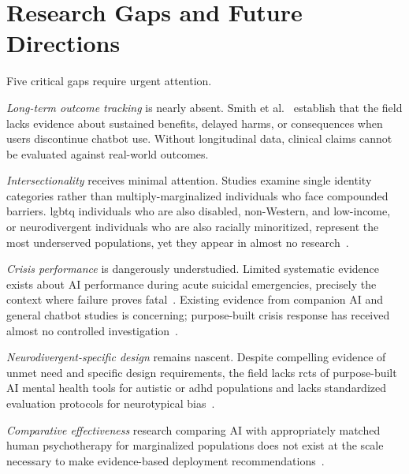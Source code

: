 \section{Research Gaps and Future Directions}

Five critical gaps require urgent attention.

\textit{Long-term outcome tracking} is nearly absent. Smith et al.~\cite{smith_2023} establish that the field lacks evidence about sustained benefits, delayed harms, or consequences when users discontinue chatbot use. Without longitudinal data, clinical claims cannot be evaluated against real-world outcomes.

\textit{Intersectionality} receives minimal attention. Studies examine single identity categories rather than multiply-marginalized individuals who face compounded barriers. \gls{lgbtq} individuals who are also disabled, non-Western, and low-income, or neurodivergent individuals who are also racially minoritized, represent the most underserved populations, yet they appear in almost no research~\cite{liu_2023,timmons_2023}.

\textit{Crisis performance} is dangerously understudied. Limited systematic evidence exists about AI performance during acute suicidal emergencies, precisely the context where failure proves fatal~\cite{de_freitas_2024}. Existing evidence from companion AI and general chatbot studies is concerning; purpose-built crisis response has received almost no controlled investigation~\cite{smith_2023}.

\textit{Neurodivergent-specific design} remains nascent. Despite compelling evidence of unmet need and specific design requirements, the field lacks \gls{rct}s of purpose-built AI mental health tools for autistic or \gls{adhd} populations and lacks standardized evaluation protocols for neurotypical bias~\cite{killian_2023,papadopoulos_2025,dehghani_2024}.

\textit{Comparative effectiveness} research comparing AI with appropriately matched human psychotherapy for marginalized populations does not exist at the scale necessary to make evidence-based deployment recommendations~\cite{abd_alrazaq_2020}.
